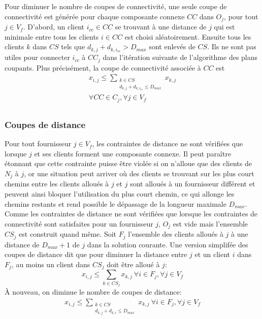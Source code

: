 \documentclass[letterpaper]{article}
\begin{document}
Pour diminuer le nombre de coupes de connectivité, une seule coupe de connectivité est générée pour chaque composante connexe $CC$ dans $O_{j}$, pour tout $j \in V_{f}$. D'abord, un client $i_{cc} \in CC$ se trouvant à une distance de $j$ qui est minimale entre tous les clients $i \in CC$ est choisi aléatoirement. Ensuite tous les clients $k$ dans $CS$ tels que $d_{k,j}+d_{k,i_{cc}}>D_{max}$ sont enlevés de $CS$. Ils ne sont pas utiles pour connecter $i_{cc}$ à $CC_{j}$ dans l'itération suivante de l'algorithme des plans coupants. Plus précisément, la coupe de connectivité associée à $CC$ est
\begin{equation}
\begin{aligned}
x_{i,j} \leq  \sum_{\substack{k \in CS \\d_{k,j}+d_{k,i_{cc}}\leq D_{max}}}{x_{k,j}} \\  
\forall CC \in C_{j}, \forall j \in V_{f}\\ 
\end{aligned}
\end{equation}
\subsubsection*{Coupes de distance}
Pour tout fournisseur $j \in V_{f}$, les contraintes de distance ne sont vérifiées que lorsque $j$ et ses clients forment une composante connexe. Il peut paraître étonnant que cette contrainte puisse être violée si on n'alloue que des clients de $N_{j}$ à $j$, or une situation peut arriver où des clients se trouvant sur les plus court chemins entre les clients alloués à $j$ et $j$ sont alloués à un fournisseur différent et peuvent ainsi bloquer l'utilisation du plus court chemin, ce qui allonge les chemins restants et rend possible le dépassage de la longueur maximale $D_{max}$.\newline \indent
Comme les contraintes de distance ne sont vérifiées que lorsque les contraintes de connectivité sont satisfaites pour un fournisseur $j$, $O_{j}$ est vide mais l'ensemble $CS_{j}$ est construit quand même. Soit $F_{j}$ l'ensemble des clients alloués à $j$ à une distance de $D_{max}+1$ de $j$ dans la solution courante.\newline \indent
Une version simplifée des coupes de distance dit que pour diminuer la distance entre $j$ et un client $i$ dans $F_{j}$, au moins un client dans $CS_{j}$ doit être alloué à $j$:
\begin{equation*}
x_{i,j} \leq \sum_{k \in CS_{j}}{x_{k,j}} \ \forall i \in F_{j}, \forall j \in V_{f}
\end{equation*}
À nouveau, on diminue le nombre de coupes de distance:
\begin{equation}
\begin{aligned}
x_{i,j} \leq \sum_{\substack{k \in CS \\d_{k,j}+d_{k,i}\leq D_{max}}}{x_{k,j}} \ \forall i \in F_{j}, \forall j \in V_{f}
\end{aligned}
\end{equation}
\end{document}
